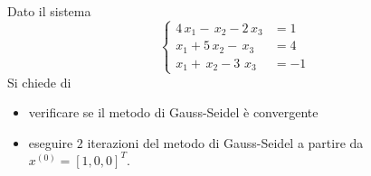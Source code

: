 Dato il sistema
\[ \left \{
\begin{array}{ll}
4\,  x_1-\, x_2-2\,x_3 &=1\\
x_1+5\, x_2 -\, x_3&=4 \\
x_1+\,x_2 - 3\, \,x_3&=-1
\end{array}
\right.
\]
Si chiede di
\begin{itemize}
\item verificare se il metodo di Gauss-Seidel  \`{e} convergente
\item eseguire  $2$ iterazioni del metodo di Gauss-Seidel a partire da $x^{(0)}=[1, 0, 0]^T.$
\end{itemize}